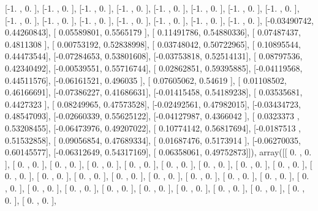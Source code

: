 \documentclass{article}
\begin{document}
       [-1.        ,  0.        ],
       [-1.        ,  0.        ],
       [-1.        ,  0.        ],
       [-1.        ,  0.        ],
       [-1.        ,  0.        ],
       [-1.        ,  0.        ],
       [-1.        ,  0.        ],
       [-1.        ,  0.        ],
       [-1.        ,  0.        ],
       [-1.        ,  0.        ],
       [-1.        ,  0.        ],
       [-1.        ,  0.        ],
       [-1.        ,  0.        ],
       [-1.        ,  0.        ],
       [-1.        ,  0.        ],
       [-0.03490742,  0.44260843],
       [ 0.05589801,  0.5565179 ],
       [ 0.11491786,  0.54880336],
       [ 0.07487437,  0.4811308 ],
       [ 0.00753192,  0.52838998],
       [ 0.03748042,  0.50722965],
       [ 0.10895544,  0.44473544],
       [-0.07284653,  0.53801608],
       [-0.03753818,  0.52514131],
       [ 0.08797536,  0.42340492],
       [-0.00539551,  0.55716744],
       [ 0.02862851,  0.59395885],
       [-0.04119568,  0.44511576],
       [-0.06161521,  0.496035  ],
       [ 0.07605062,  0.54619   ],
       [ 0.01108502,  0.46166691],
       [-0.07386227,  0.41686631],
       [-0.01415458,  0.54189238],
       [ 0.03535681,  0.4427323 ],
       [ 0.08249965,  0.47573528],
       [-0.02492561,  0.47982015],
       [-0.03434723,  0.48547093],
       [-0.02660339,  0.55625122],
       [-0.04127987,  0.4366042 ],
       [ 0.0323373 ,  0.53208455],
       [-0.06473976,  0.49207022],
       [ 0.10774142,  0.56817694],
       [-0.0187513 ,  0.51532858],
       [ 0.09056854,  0.47689334],
       [ 0.01687476,  0.5173914 ],
       [-0.06270035,  0.60145577],
       [-0.06312649,  0.54317169],
       [ 0.06358061,  0.49752873]]), array([[ 0.        ,  0.        ],
       [ 0.        ,  0.        ],
       [ 0.        ,  0.        ],
       [ 0.        ,  0.        ],
       [ 0.        ,  0.        ],
       [ 0.        ,  0.        ],
       [ 0.        ,  0.        ],
       [ 0.        ,  0.        ],
       [ 0.        ,  0.        ],
       [ 0.        ,  0.        ],
       [ 0.        ,  0.        ],
       [ 0.        ,  0.        ],
       [ 0.        ,  0.        ],
       [ 0.        ,  0.        ],
       [ 0.        ,  0.        ],
       [ 0.        ,  0.        ],
       [ 0.        ,  0.        ],
       [ 0.        ,  0.        ],
       [ 0.        ,  0.        ],
       [ 0.        ,  0.        ],
       [ 0.        ,  0.        ],
       [ 0.        ,  0.        ],
       [ 0.        ,  0.        ],
       [ 0.        ,  0.        ],
       [ 0.        ,  0.        ],
       [ 0.        ,  0.        ],
       [ 0.        ,  0.        ],
\end{document}
